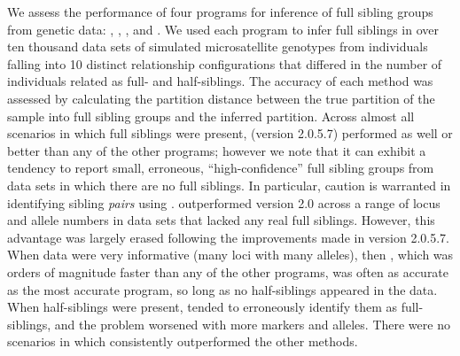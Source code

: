 

We assess the performance of four programs for inference of full sibling groups from
genetic data: \colony{} \citep{wang04,Wang2012pairwise}, \prt{} 
\citep{almudevar99}, \familyfinder{} \citep{beyer03}, and \kinalyzer{} 
\citep{bergerwolf07, sheik08}. We used each program to infer full siblings
in over ten thousand data sets of simulated microsatellite  
genotypes from individuals falling into 10 distinct relationship configurations
that differed in the number of individuals related as full- and half-siblings. 
The accuracy of
each method was assessed by calculating the partition distance between the true partition
of the sample into full sibling groups and the inferred partition. Across almost all
scenarios in which full siblings were present, \colony{} (version 2.0.5.7) performed as well or better than
any of the other programs; however we note that it can exhibit a tendency to report 
small, erroneous, ``high-confidence'' full sibling groups from data sets in which there
are no full siblings. In particular, caution is warranted in identifying sibling
{\em pairs} using \colony{}.  \prt{} outperformed \colony{} version 2.0 across a range of 
locus and allele numbers in data sets that lacked any real full siblings.  However, this advantage
was largely erased following the improvements made in \colony{} version 2.0.5.7. 
When data were very informative (many loci with many alleles), then
\familyfinder{}, which was orders of magnitude faster than any of the other programs,
was often as accurate as the most accurate program, so long as no
half-siblings appeared in the data.  When half-siblings
were present, \familyfinder{} tended to erroneously identify
them as full-siblings, and the problem worsened with more markers and alleles.
There were no scenarios in which \kinalyzer{} consistently outperformed the other methods.

